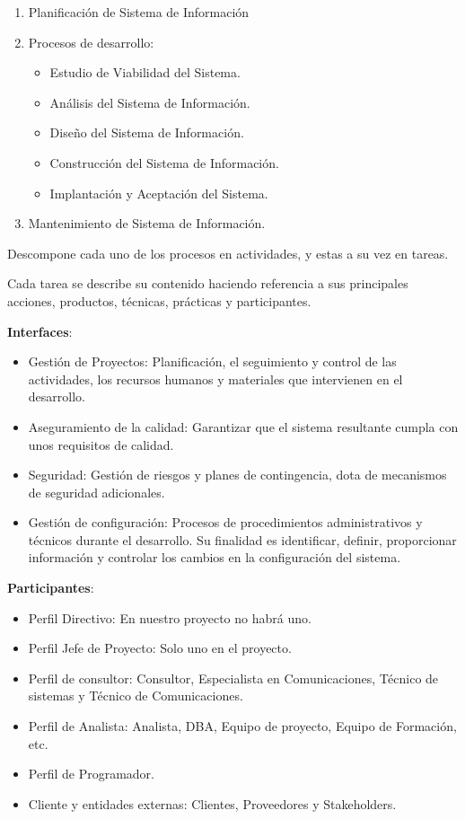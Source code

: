 \documentclass[12pt, twoside, openright]{report} %
\begin{document}
\begin{enumerate}
\def\labelenumi{\arabic{enumi}.}

\item
  Planificación de Sistema de Información
\item
  Procesos de desarrollo:

  \begin{itemize}
  
  \item
    Estudio de Viabilidad del Sistema.
  \item
    Análisis del Sistema de Información.
  \item
    Diseño del Sistema de Información.
  \item
    Construcción del Sistema de Información.
  \item
    Implantación y Aceptación del Sistema.
  \end{itemize}
\item
  Mantenimiento de Sistema de Información.
\end{enumerate}

Descompone cada uno de los procesos en actividades, y estas a su vez en tareas.

Cada tarea se describe su contenido haciendo referencia a sus
principales acciones, productos, técnicas, prácticas y participantes.

\textbf{Interfaces}:

\begin{itemize}

\item
  Gestión de Proyectos: Planificación, el seguimiento y control de las
  actividades, los recursos humanos y materiales que intervienen en el
  desarrollo.
\item
  Aseguramiento de la calidad: Garantizar que el sistema resultante
  cumpla con unos requisitos de calidad.
\item
  Seguridad: Gestión de riesgos y planes de contingencia, dota de
  mecanismos de seguridad adicionales.
\item
  Gestión de configuración: Procesos de procedimientos administrativos y
  técnicos durante el desarrollo. Su finalidad es identificar, definir,
  proporcionar información y controlar los cambios en la configuración
  del sistema.
\end{itemize}

\textbf{Participantes}:

\begin{itemize}

\item
  Perfil Directivo: En nuestro proyecto no habrá uno.
\item
  Perfil Jefe de Proyecto: Solo uno en el proyecto.
\item
  Perfil de consultor: Consultor, Especialista en Comunicaciones,
  Técnico de sistemas y Técnico de Comunicaciones.
\item
  Perfil de Analista: Analista, DBA, Equipo de proyecto, Equipo de
  Formación, etc.
\item
  Perfil de Programador.
\item
  Cliente y entidades externas: Clientes, Proveedores y Stakeholders.
\end{itemize}
\end{document}
